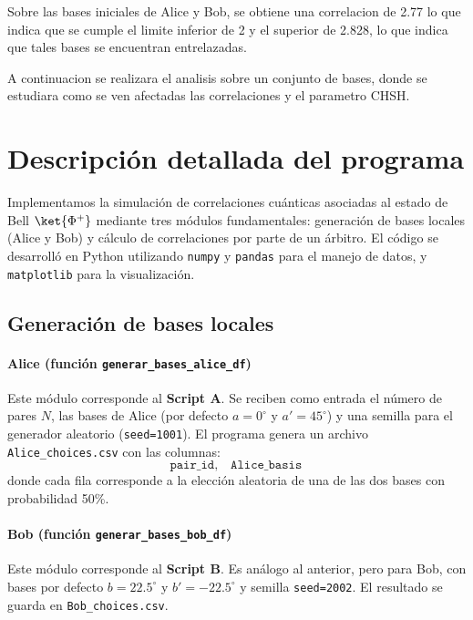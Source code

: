 \documentclass[11pt]{article}
\begin{document}
Sobre las bases iniciales de Alice y Bob, se obtiene una correlacion de 2.77 lo que indica que se cumple el limite inferior de 2 y el superior de 2.828, lo que indica que tales bases se encuentran entrelazadas.

A continuacion se realizara el analisis sobre un conjunto de bases, donde se estudiara como se ven afectadas las correlaciones y el parametro CHSH.






\section{Descripción detallada del programa}

Implementamos la simulación de correlaciones cuánticas asociadas al estado de Bell $\ket{\Phi^+}$ mediante tres módulos fundamentales: generación de bases locales (Alice y Bob) y cálculo de correlaciones por parte de un árbitro. El código se desarrolló en Python utilizando \texttt{numpy} y \texttt{pandas} para el manejo de datos, y \texttt{matplotlib} para la visualización.

\subsection{Generación de bases locales}

\paragraph{Alice (función \texttt{generar\_bases\_alice\_df})}
Este módulo corresponde al \textbf{Script A}. Se reciben como entrada el número de pares $N$, las bases de Alice (por defecto $a=0^\circ$ y $a'=45^\circ$) y una semilla para el generador aleatorio (\texttt{seed=1001}).  
El programa genera un archivo \texttt{Alice\_choices.csv} con las columnas:
\[
\texttt{pair\_id}, \quad \texttt{Alice\_basis}
\]
donde cada fila corresponde a la elección aleatoria de una de las dos bases con probabilidad 50\%.

\paragraph{Bob (función \texttt{generar\_bases\_bob\_df})}
Este módulo corresponde al \textbf{Script B}. Es análogo al anterior, pero para Bob, con bases por defecto $b=22.5^\circ$ y $b'=-22.5^\circ$ y semilla \texttt{seed=2002}. El resultado se guarda en \texttt{Bob\_choices.csv}.
\end{document}
